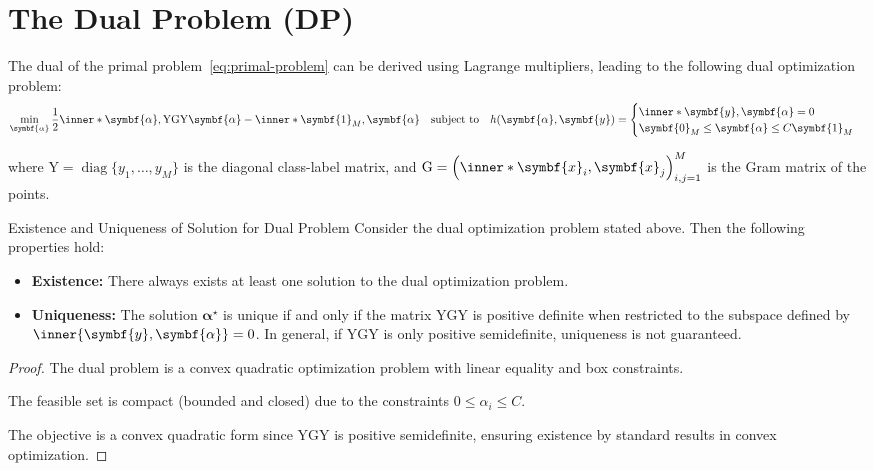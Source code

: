 {\section{The Dual Problem (DP)}
The dual of the primal problem~\eqref{eq:primal-problem} can be derived using Lagrange multipliers, leading to the following dual optimization problem:
\begin{align}\label{eq:dual-problem}
  \min_{\symbf{\alpha}}\frac{1}{2} \inner*{\symbf{\alpha}, \mathrm{Y} \mathrm{G} \mathrm{Y} \symbf{\alpha}} - \inner*{\symbf{1}_M, \symbf{\alpha}}
  \quad \text{subject to} \quad
  h(\symbf{\alpha}, \symbf{y}) =
  \begin{cases}
    \inner*{\symbf{y}, \symbf{\alpha}} = 0 \\
    \symbf{0}_M \leq \symbf{\alpha} \leq C\symbf{1}_M
  \end{cases}
\end{align}

where \(\mathrm{Y} = \operatorname{diag}\{y_1, \ldots, y_M\}\) is the diagonal class-label matrix, and \(\mathrm{G} = \left(\inner*{\symbf{x}_i, \symbf{x}_j}\right)_{i,j=1}^M\) is the Gram matrix of the points.

\begin{theorem}{Existence and Uniqueness of Solution for Dual Problem}{}
  Consider the dual optimization problem stated above. Then the following properties hold:
  \begin{itemize}
    \item[(i)] \textbf{Existence:} There always exists at least one solution to the dual optimization problem.
    \item[(ii)] \textbf{Uniqueness:} The solution \(\symbf{\alpha}^\star\) is unique if and only if the matrix \(\mathrm{Y}\mathrm{G}\mathrm{Y}\) is positive definite when restricted to the subspace defined by \(\inner{\symbf{y},\symbf{\alpha}}=0\). In general, if \(\mathrm{Y}\mathrm{G}\mathrm{Y}\) is only positive semidefinite, uniqueness is not guaranteed.
  \end{itemize}
\end{theorem}

\begin{proof}{}{}

  The dual problem is a convex quadratic optimization problem with linear equality and box constraints.

  The feasible set is compact (bounded and closed) due to the constraints \(0\leq \alpha_i \le C\).

  The objective is a convex quadratic form since \(\mathrm{Y}\mathrm{G}\mathrm{Y}\) is positive semidefinite, ensuring existence by standard results in convex optimization\cite{nocedal2006numerical}.


\end{proof}}
